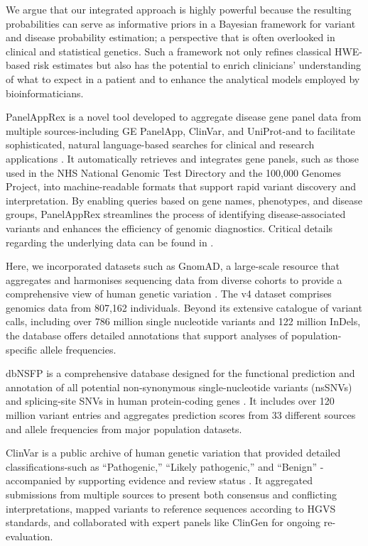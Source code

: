 We argue that our integrated approach is highly powerful because the resulting probabilities can serve as informative priors in a Bayesian framework for variant and disease probability estimation; a perspective that is often overlooked in clinical and statistical genetics. Such a framework not only refines classical HWE-based risk estimates but also has the potential to enrich clinicians’ understanding of what to expect in a patient and to enhance the analytical models employed by bioinformaticians.

PanelAppRex is a novel tool developed to aggregate disease gene panel data from multiple sources-including GE PanelApp, ClinVar, and UniProt-and to facilitate sophisticated, natural language-based searches for clinical and research applications
\cite{lawless_panelapprex_2025}. It automatically retrieves and integrates gene panels, such as those used in the NHS National Genomic Test Directory and the 100,000 Genomes Project, into machine-readable formats that support rapid variant discovery and interpretation. By enabling queries based on gene names, phenotypes, and disease groups, PanelAppRex streamlines the process of identifying disease-associated variants and enhances the efficiency of genomic diagnostics. Critical details regarding the underlying data can be found in \citet{martin_panelapp_2019, landrum_clinvar_2018, the_uniprot_consortium_uniprot_2025}.

Here, we incorporated datasets such as GnomAD, a large-scale resource that aggregates and harmonises sequencing data from diverse cohorts to provide a comprehensive view of human genetic variation \cite{karczewski2020mutational}. The v4 dataset comprises genomics data from 807,162 individuals.
Beyond its extensive catalogue of variant calls, including over 786 million single nucleotide variants and 122 million InDels, the database offers detailed annotations that support analyses of population-specific allele frequencies.

dbNSFP is a comprehensive database designed for the functional prediction and annotation of all potential non-synonymous single-nucleotide variants (nsSNVs) and splicing-site SNVs in human protein-coding genes \cite{liu_dbnsfp_2020}. It includes over 120 million variant entries and aggregates prediction scores from 33 different sources and allele frequencies from major population datasets.

ClinVar is a public archive of human genetic variation that provided detailed classifications-such as ``Pathogenic,'' ``Likely pathogenic,'' and ``Benign'' -accompanied by supporting evidence and review status \cite{landrum_clinvar_2018}. It aggregated submissions from multiple sources to present both consensus and conflicting interpretations, mapped variants to reference sequences according to HGVS standards, and collaborated with expert panels like ClinGen for ongoing re-evaluation.

